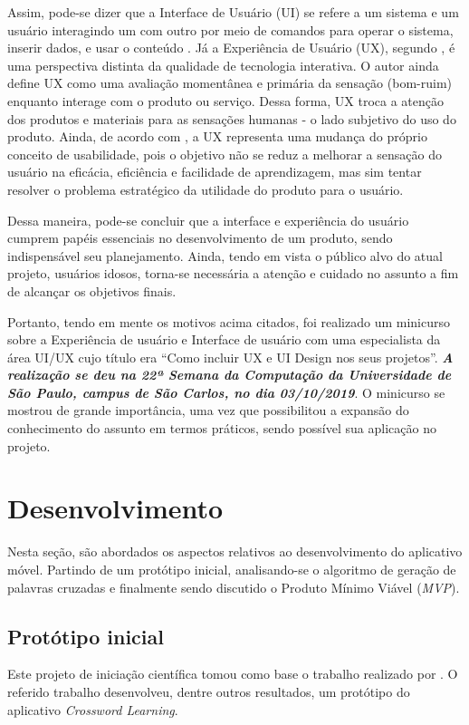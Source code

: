 Assim, pode-se dizer que a Interface de Usuário (UI) se refere a um sistema e um usuário interagindo um com outro por meio de comandos para operar o sistema, inserir dados, e usar o conteúdo \citep{joo2015}. Já a Experiência de Usuário (UX), segundo \cite{marc2008}, é uma perspectiva distinta da qualidade de tecnologia interativa. O autor ainda define UX como uma avaliação momentânea e primária da sensação (bom-ruim) enquanto interage com o produto ou serviço. Dessa forma, UX troca a atenção dos produtos e materiais para as sensações humanas - o lado subjetivo do uso do produto. Ainda, de acordo com \cite{castilla2017}, a UX representa uma mudança do próprio conceito de usabilidade, pois o objetivo não se reduz a melhorar a sensação do usuário na eficácia, eficiência e facilidade de aprendizagem, mas sim tentar resolver o problema estratégico da utilidade do produto para o usuário. 

Dessa maneira, pode-se concluir que a interface e experiência do usuário cumprem papéis essenciais no desenvolvimento de um produto, sendo indispensável seu planejamento. Ainda, tendo em vista o público alvo do atual projeto, usuários idosos, torna-se necessária a atenção e cuidado no assunto a fim de alcançar os objetivos finais.

Portanto, tendo em mente os motivos acima citados, foi realizado um minicurso sobre a Experiência de usuário e Interface de usuário com uma especialista da área UI/UX cujo título era ``Como incluir UX e UI Design nos seus projetos''. \textbf{\textit{A realização se deu na 22ª Semana da Computação da Universidade de São Paulo, campus de São Carlos, no dia 03/10/2019}}. O minicurso se mostrou de grande importância, uma vez que possibilitou a expansão do conhecimento do assunto em termos práticos, sendo possível sua aplicação no projeto.

\section{Desenvolvimento}
Nesta seção, são abordados os aspectos relativos ao desenvolvimento do aplicativo móvel. Partindo de um protótipo inicial, analisando-se o algoritmo de geração de palavras cruzadas e finalmente sendo discutido o Produto Mínimo Viável (\textit{MVP}).

\subsection{Protótipo inicial}
\label{subsec:prototipoInicial}
Este projeto  de iniciação científica tomou como base o trabalho realizado por \cite{oliveira2018crossword}. O referido trabalho desenvolveu, dentre outros resultados, um protótipo do aplicativo \textit{Crossword Learning}.

